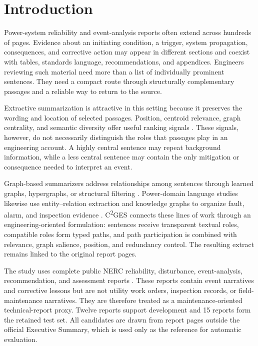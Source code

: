\documentclass[applsci,article,submit,moreauthors]{Definitions/mdpi}
\newcommand{\cges}{C\textsuperscript{2}GES}
\begin{document}
\section{Introduction}

Power-system reliability and event-analysis reports often extend across hundreds of pages. Evidence about an initiating condition, a trigger, system propagation, consequences, and corrective action may appear in different sections and coexist with tables, standards language, recommendations, and appendices. Engineers reviewing such material need more than a list of individually prominent sentences. They need a compact route through structurally complementary passages and a reliable way to return to the source.

Extractive summarization is attractive in this setting because it preserves the wording and location of selected passages. Position, centroid relevance, graph centrality, and semantic diversity offer useful ranking signals \cite{zhong2020extractive,bi2021aredsum,liu2021unsupervised,mihalcea2004textrank,reimers2019sentencebert}. These signals, however, do not necessarily distinguish the roles that passages play in an engineering account. A highly central sentence may repeat background information, while a less central sentence may contain the only mitigation or consequence needed to interpret an event.

Graph-based summarizers address relationships among sentences through learned graphs, hypergraphs, or structural filtering \cite{siragusa2022sentencegraph,onan2024mches,hark2025mis}. Power-domain language studies likewise use entity--relation extraction and knowledge graphs to organize fault, alarm, and inspection evidence \cite{liu2022powerfault,ma2025alarm,zgg2026bridge}. \cges{} connects these lines of work through an engineering-oriented formulation: sentences receive transparent textual roles, compatible roles form typed paths, and path participation is combined with relevance, graph salience, position, and redundancy control. The resulting extract remains linked to the original report pages.

The study uses complete public NERC reliability, disturbance, event-analysis, recommendation, and assessment reports \cite{nercEventAnalysis,nerc2015qualityreport}. These reports contain event narratives and corrective lessons but are not utility work orders, inspection records, or field-maintenance narratives. They are therefore treated as a maintenance-oriented technical-report proxy. Twelve reports support development and 15 reports form the retained test set. All candidates are drawn from report pages outside the official Executive Summary, which is used only as the reference for automatic evaluation.
\end{document}
